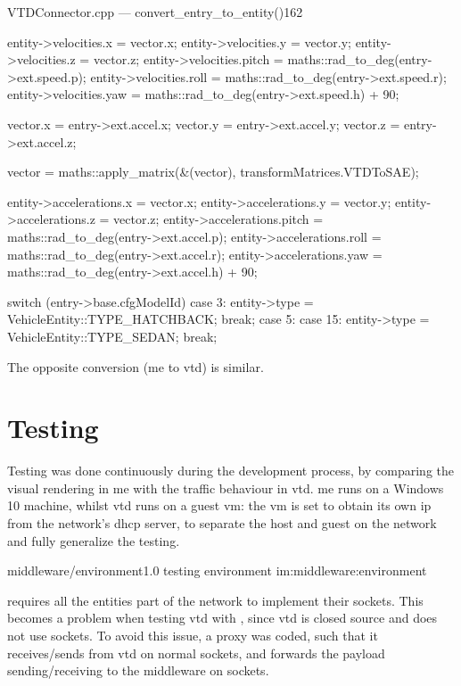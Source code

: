 \begin{codelist}{VTDConnector.cpp --- convert\_entry\_to\_entity()}{162}
{{		entity->velocities.x     = vector.x;
		entity->velocities.y     = vector.y;
		entity->velocities.z     = vector.z;
		entity->velocities.pitch = maths::rad_to_deg(entry->ext.speed.p);
		entity->velocities.roll  = maths::rad_to_deg(entry->ext.speed.r);
		entity->velocities.yaw   = maths::rad_to_deg(entry->ext.speed.h) + 90;

		vector.x = entry->ext.accel.x;
		vector.y = entry->ext.accel.y;
		vector.z = entry->ext.accel.z;

		vector = maths::apply_matrix(&(vector), transformMatrices.VTDToSAE);

		entity->accelerations.x     = vector.x;
		entity->accelerations.y     = vector.y;
		entity->accelerations.z     = vector.z;
		entity->accelerations.pitch = maths::rad_to_deg(entry->ext.accel.p);
		entity->accelerations.roll  = maths::rad_to_deg(entry->ext.accel.r);
		entity->accelerations.yaw   = maths::rad_to_deg(entry->ext.accel.h) + 90;
	}

	switch (entry->base.cfgModelId) {
		case 3:
			entity->type = VehicleEntity::TYPE_HATCHBACK;
			break;
		case 5:
		case 15:
			entity->type = VehicleEntity::TYPE_SEDAN;
			break;
	}
}
\end{codelist}

The opposite conversion (\gls{me} to \gls{vtd}) is similar.

\section{Testing}\label{sc:middleware:testing}

Testing was done continuously during the development process, by comparing the visual rendering in \gls{me} with the traffic behaviour in \gls{vtd}. \gls{me} runs on a Windows 10 machine, whilst \gls{vtd} runs on a guest \gls{vm}: the \gls{vm} is set to obtain its own \gls{ip} from the network's \gls{dhcp} server, to separate the host and guest on the network and fully generalize the testing.

\begin{image}
	{middleware/environment}{1.0}
	{testing environment}
	{im:middleware:environment}
	{}
	{}
\end{image} %

 requires all the entities part of the network to implement their sockets. This becomes a problem when testing \gls{vtd} with , since \gls{vtd} is closed source and does not use  sockets. To avoid this issue, a \gls{proxy} was coded, such that it receives/sends from \gls{vtd} on normal sockets, and forwards the \gls{payload} sending/receiving to the \gls{middleware} on  sockets.

